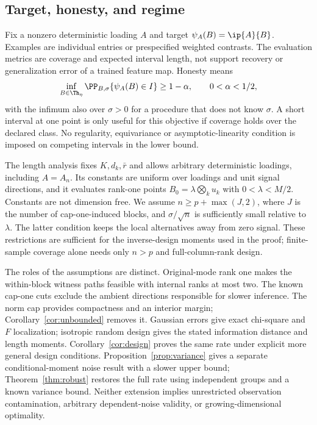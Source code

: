 \subsection{Target, honesty, and regime}
Fix a nonzero deterministic loading $A$ and target $\psi_A(B)=\ip{A}{B}$. Examples are individual entries or prespecified weighted contrasts. The evaluation metrics are coverage and expected interval length, not support recovery or generalization error of a trained feature map. Honesty means
\[
 \inf_{B\in\Th_\eta}\PP_{B,\sigma}\{\psi_A(B)\in I\}\ge1-\alpha,
 \qquad 0<\alpha<1/2,
\]
with the infimum also over $\sigma>0$ for a procedure that does not know $\sigma$. A short interval at one point is only useful for this objective if coverage holds over the declared class. No regularity, equivariance or asymptotic-linearity condition is imposed on competing intervals in the lower bound.

The length analysis fixes $K,d_k,\bar r$ and allows arbitrary deterministic loadings, including $A=A_n$. Its constants are uniform over loadings and unit signal directions, and it evaluates rank-one points $B_0=\lambda\bigotimes_ku_k$ with $0<\lambda<M/2$. Constants are not dimension free. We assume $n\ge p+\max(J,2)$, where $J$ is the number of cap-one-induced blocks, and $\sigma/\sqrt n$ is sufficiently small relative to $\lambda$. The latter condition keeps the local alternatives away from zero signal. These restrictions are sufficient for the inverse-design moments used in the proof; finite-sample coverage alone needs only $n>p$ and full-column-rank design.

The roles of the assumptions are distinct. Original-mode rank one makes the within-block witness paths feasible with internal ranks at most two. The known cap-one cuts exclude the ambient directions responsible for slower inference. The norm cap provides compactness and an interior margin; Corollary~\ref{cor:unbounded} removes it. Gaussian errors give exact chi-square and $F$ localization; isotropic random design gives the stated information distance and length moments. Corollary~\ref{cor:design} proves the same rate under explicit more general design conditions. Proposition~\ref{prop:variance} gives a separate conditional-moment noise result with a slower upper bound; Theorem~\ref{thm:robust} restores the full rate using independent groups and a known variance bound. Neither extension implies unrestricted observation contamination, arbitrary dependent-noise validity, or growing-dimensional optimality.
